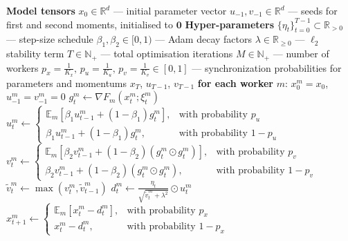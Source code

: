 \begin{algorithm}[h]
\caption{\texttt{DES-LOC-Adam} (with probabilistic synchronization)}
\label{alg:desloc_adam_prob}
\begin{algorithmic}[1]
\REQUIRE \textbf{Model tensors}
\STATE $x_0 \in \mathbb{R}^d$ --- initial parameter vector
\STATE $u_{-1}, v_{-1} \in \mathbb{R}^d$ --- seeds for first and second moments, initialised to $\mathbf{0}$
\REQUIRE \textbf{Hyper-parameters}
\STATE $\{\eta_t\}_{t=0}^{T-1} \subset \mathbb{R}_{>0}$ --- step-size schedule
\STATE $\beta_1, \beta_2 \in [0,1)$ --- Adam decay factors
\STATE $\lambda \in \mathbb{R}_{\geq 0}$ --- $\ell_2$ stability term
\STATE $T \in \mathbb{N}_+$ --- total optimisation iterations
\STATE $M \in \mathbb{N}_+$ --- number of workers
\STATE $p_x = \frac{1}{K_x},\, p_u = \frac{1}{K_u},\, p_v = \frac{1}{K_v} \in [0,1]$ --- synchronization probabilities for parameters and momentums
\ENSURE $x_T$, $u_{T-1}$, $v_{T-1}$
\STATE \textbf{for each worker} $m$: $x_0^m = x_0$, $u_{-1}^m = v_{-1}^m = 0$ 
\STATE $g_t^m \leftarrow \nabla F_m(x_t^m; \xi_t^m)$ 
\STATE $u_t^m \leftarrow \begin{cases} \mathbb{E}_m[\beta_1 u_{t-1}^m + (1-\beta_1) g_t^m], & \text{with probability } p_u \\ \beta_1 u_{t-1}^m + (1-\beta_1) g_t^m, & \text{with probability } 1 - p_u \end{cases}$ 
\STATE $v_t^m \leftarrow \begin{cases} \mathbb{E}_m[\beta_2 v_{t-1}^m + (1-\beta_2)(g_t^m \odot g_t^m)], & \text{with probability } p_v \\ \beta_2 v_{t-1}^m + (1-\beta_2)(g_t^m \odot g_t^m), & \text{with probability } 1 - p_v \end{cases}$ 
\STATE $\tilde{v}_t^m \leftarrow \max(v_t^m, \tilde{v}_{t-1}^m)$ 
\STATE $d_t^m \leftarrow \frac{\eta_t}{\sqrt{\tilde{v}_t^m + \lambda^2}} \odot u_t^m$ 
\STATE $x_{t+1}^m \leftarrow \begin{cases} \mathbb{E}_m[x_t^m - d_t^m], & \text{with probability } p_x \\ x_t^m - d_t^m, & \text{with probability } 1 - p_x \end{cases}$ 
\ENDFOR
\ENDFOR
\end{algorithmic}
\end{algorithm}

